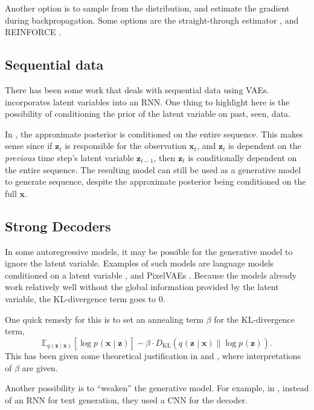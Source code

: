 \documentclass{article}
\newcommand{\prob}[3]{{#1}_{#2} \left( #3 \right)}
\newcommand{\condprob}[4]{{#1}_{#2} \left( #3 \middle| #4 \right)}
\newcommand{\expected}[2]{\mathbb{E}_{#1}\left[ #2 \right]}
\newcommand{\KL}[2]{D_{\mathrm{KL}}\left( #1 \| #2 \right)}
\newcommand{\x}{\mathbf{x}}
\newcommand{\z}{\mathbf{z}}
\begin{document}
Another option is to sample from the distribution, and estimate the gradient during backpropagation. Some options are the straight-through estimator \citep{bengio2013estimating}, and REINFORCE \citep{williams1988use}.

\subsection{Sequential data}
There has been some work that deals with sequential data using VAEs. \cite{chung2015recurrent} incorporates latent variables into an RNN. One thing to highlight here is the possibility of conditioning the prior of the latent variable on past, seen, data.

In \cite{shabanian2017variational}, the approximate posterior is conditioned on the entire sequence. This makes sense since if $\z_t$ is responsible for the observation $\x_t$, and $\z_t$ is dependent on the \emph{previous} time step's latent variable $\z_{t-1}$, then $\z_t$ is conditionally dependent on the entire sequence. The resulting model can still be used as a generative model to generate sequence, despite the approximate posterior being conditioned on the full $\x$.

\subsection{Strong Decoders}
In some autoregressive models, it may be possible for the generative model to ignore the latent variable. Examples of such models are language models conditioned on a latent variable \citep{bowman2015generating}, and PixelVAEs \citep{gulrajani2016pixelvae}. Because the models already work relatively well without the global information provided by the latent variable, the KL-divergence term goes to 0.

One quick remedy for this is to set an annealing term $\beta$ for the KL-divergence term,
$$\expected{\condprob{q}{}{\z}{\x}}{\log \condprob{p}{}{\x}{\z}}
- \beta \cdot \KL{\condprob{q}{}{\z}{\x}}{\log \prob{p}{}{\z}}.$$
This has been given some theoretical justification in \cite{higgins2016beta} and \cite{alemi2017information}, where interpretations of $\beta$ are given.

Another possibility is to ``weaken'' the generative model. For example, in \cite{yang2017improved}, instead of an RNN for text generation, they used a CNN for the decoder.
\end{document}
